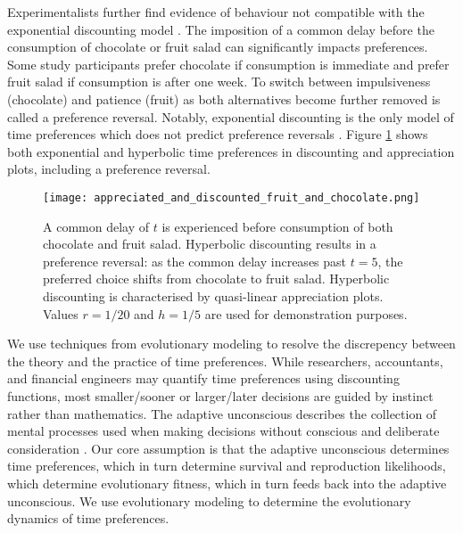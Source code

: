 \documentclass[titlepage, hidelinks, 12pt]{article}
\theoremstyle{plain}
\theoremstyle{remark}
\theoremstyle{definition}
\begin{document}
Experimentalists further find evidence of behaviour not compatible with the exponential discounting model \cite{read98}. 
The imposition of a common delay before the consumption of chocolate or fruit salad can significantly impacts preferences. 
Some study participants prefer chocolate if consumption is immediate and prefer fruit salad if consumption is after one week. 
To switch between impulsiveness (chocolate) and patience
(fruit) as
both alternatives become further removed is called a preference reversal. 
Notably, exponential discounting is the only model of time preferences which does not predict preference reversals
\cite{strotz55}. Figure \ref{fig:discountedValueHyperbolic} shows both exponential and hyperbolic time preferences in discounting and appreciation
plots, including a preference reversal. 




\begin{figure}[H]
    \centering
    \texttt{[image: appreciated\_and\_discounted\_fruit\_and\_chocolate.png]}
    \caption[Graphical depiction of a preference reversal.]{A common delay of $t$ is experienced before consumption of both chocolate
    and fruit salad. Hyperbolic discounting results in a preference reversal: as the common delay increases past $t = 5$, the preferred
choice shifts from chocolate to fruit salad. Hyperbolic discounting is characterised by quasi-linear appreciation plots. Values $r = 1/20$ and
$h = 1/5$ are used for demonstration purposes.} 
    \label{fig:discountedValueHyperbolic}
\end{figure}


We use techniques from evolutionary modeling to resolve the discrepency between the theory and the practice of time preferences.
While researchers, accountants, and financial engineers may quantify time preferences using
discounting functions, most smaller/sooner or larger/later decisions are guided by instinct rather than mathematics. 
The adaptive unconscious describes the collection of mental processes used when making 
decisions without conscious and deliberate consideration \cite{wegner02}. 
Our core assumption is that 
the adaptive unconscious determines time preferences, which in turn determine survival and reproduction likelihoods, 
which determine evolutionary fitness, which in turn feeds back into the adaptive unconscious. 
We use evolutionary modeling to determine the evolutionary dynamics of time preferences. 
\end{document}
